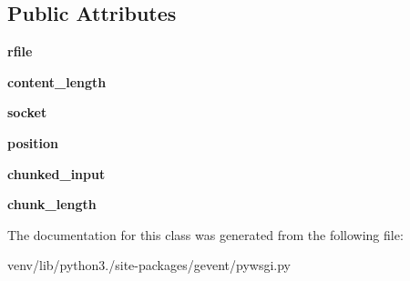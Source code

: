 \subsection*{Public Attributes}
\begin{DoxyCompactItemize}
\item 
\mbox{\label{classgevent_1_1pywsgi_1_1_input_a29ecc32f253b27ac96f5509fd7786a86}} 
{\bfseries rfile}
\item 
\mbox{\label{classgevent_1_1pywsgi_1_1_input_a9332b1d64d3f38baa93c7f7513a75cd5}} 
{\bfseries content\+\_\+length}
\item 
\mbox{\label{classgevent_1_1pywsgi_1_1_input_ab8b99c683d5eda198b3008c4df75443e}} 
{\bfseries socket}
\item 
\mbox{\label{classgevent_1_1pywsgi_1_1_input_a22353c9a87e7d7eabb6ec9cd370dcaff}} 
{\bfseries position}
\item 
\mbox{\label{classgevent_1_1pywsgi_1_1_input_a635e5f7302469aa047959a4a3afff6ba}} 
{\bfseries chunked\+\_\+input}
\item 
\mbox{\label{classgevent_1_1pywsgi_1_1_input_a3e9a30f107c697d3a87b65cca56027b0}} 
{\bfseries chunk\+\_\+length}
\end{DoxyCompactItemize}


The documentation for this class was generated from the following file\+:\begin{DoxyCompactItemize}
\item 
venv/lib/python3./site-\/packages/gevent/pywsgi.\+py\end{DoxyCompactItemize}
